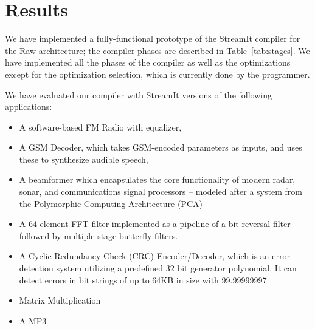 \section{Results}
\label{sec:results}

We have implemented a fully-functional prototype of the StreamIt
compiler for the Raw architecture; the compiler phases are described
in Table~\ref{tab:stages}. We have implemented all the phases of the
compiler as well as the optimizations except for the optimization
selection, which is currently done by the programmer.



We have evaluated our compiler with StreamIt versions of the following
applications: 
\begin{itemize}

\item A software-based FM Radio with
equalizer, 

\item A GSM Decoder, which takes GSM-encoded parameters as
inputs, and uses these to synthesize audible speech, 

\item A beamformer
which encapsulates the core functionality of modern radar, sonar, and
communications signal processors -- modeled after a system from the
Polymorphic Computing Architecture (PCA) \cite{pca}

\item A 64-element FFT filter implemented as a pipeline of a bit reversal 
filter followed by multiple-stage butterfly filters.

\item A Cyclic Redundancy Check (CRC) Encoder/Decoder, which is an error detection system utilizing a predefined 32 bit generator polynomial.  It can detect errors in bit strings of up to 64KB in size with 99.99999997%

\item Matrix Multiplication 

\item A MP3


\end{itemize}



